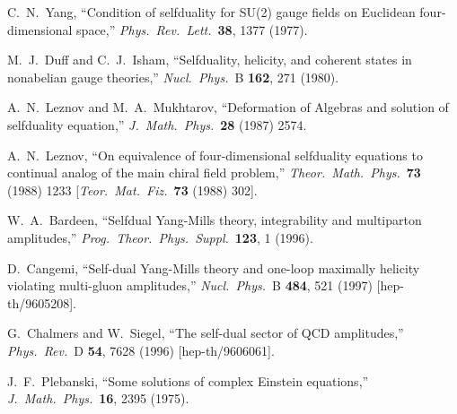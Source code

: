 \begin{thebibliography}{99}
C.~N.~Yang,
``Condition of selfduality for SU(2) gauge fields on 
Euclidean four-dimensional space,''
{\it Phys.\ Rev.\ Lett.}\  {\bf 38}, 1377 (1977).

M.~J.~Duff and C.~J.~Isham,
``Selfduality, helicity, and coherent states in nonabelian gauge theories,''
{\it Nucl.\ Phys.}\ B {\bf 162}, 271 (1980).

A.~N.~Leznov and M.~A.~Mukhtarov,
``Deformation of Algebras and solution of selfduality equation,''
{\it J.\ Math.\ Phys.}\  {\bf 28} (1987) 2574.

A.~N.~Leznov,
``On equivalence of four-dimensional selfduality equations to continual 
analog of the main chiral field problem,''
{\it Theor.\ Math.\ Phys.}\  {\bf 73} (1988) 1233
[{\it Teor.\ Mat.\ Fiz.}\  {\bf 73} (1988) 302].

W.~A.~Bardeen,
``Selfdual Yang-Mills theory, integrability and multiparton amplitudes,''
{\it Prog.\ Theor.\ Phys.\ Suppl.}\  {\bf 123}, 1 (1996).

D.~Cangemi,
``Self-dual Yang-Mills theory and one-loop maximally helicity violating  
multi-gluon amplitudes,''
{\it Nucl.\ Phys.}\ B {\bf 484}, 521 (1997)
[hep-th/9605208].

G.~Chalmers and W.~Siegel,
``The self-dual sector of {QCD} amplitudes,''
{\it Phys.\ Rev.}\ D {\bf 54}, 7628 (1996)
[hep-th/9606061].

J.~F.~Plebanski,
``Some solutions of complex Einstein equations,''
{\it J.\ Math.\ Phys.}\  {\bf 16}, 2395 (1975).


\end{thebibliography}

